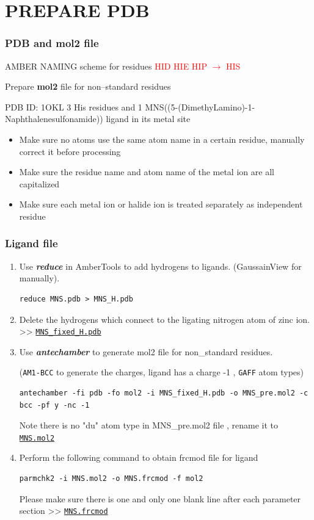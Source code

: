 \documentclass[hyperref={breaklinks,colorlinks}]{beamer}
\author{Zhang Haomiao } \institute{HUST} \date{\today}
\begin{document}
\frame{\maketitle} \frame{\tableofcontents{}}
\section{PREPARE PDB}
\begin{frame}  
  \frametitle{PDB and mol2 file}
  AMBER NAMING scheme for residues \textcolor{red}{HID HIE HIP
    $\rightarrow$ HIS}

  Prepare \textbf{mol2} file for non--standard residues
  \begin{block}{PDB ID: 1OKL}
    3 His residues and 1
    MNS((5-(DimethyLamino)-1-Naphthalenesulfonamide)) ligand in its
    metal site
  \end{block}
  \begin{itemize}
  \item Make sure no atoms use the same atom name in a certain
    residue, manually correct it before processing
  \item Make sure the residue name and atom name of the metal ion are
    all capitalized
  \item Make sure each metal ion or halide ion is treated separately
    as independent residue
  \end{itemize}
\end{frame}


\begin{frame}[t,fragile]
  \frametitle{Ligand file}
  \begin{enumerate}
  \item Use \textit{\textbf{reduce}} in AmberTools to add hydrogens to
    ligands. (GaussainView for manually).
\begin{lstlisting}
reduce MNS.pdb > MNS_H.pdb
\end{lstlisting}
  \item Delete the hydrogens which connect to the ligating nitrogen
    atom of zinc ion.  >> \underline{\texttt{MNS\_fixed\_H.pdb}} %
  \item Use \textit{\textbf{antechamber}} to generate mol2 file for
    non\_standard residues.

    (\texttt{AM1-BCC} to generate the charges, ligand has a charge -1
    , \texttt{GAFF} atom types)
\begin{lstlisting}
antechamber -fi pdb -fo mol2 -i MNS_fixed_H.pdb -o MNS_pre.mol2 -c bcc -pf y -nc -1 
\end{lstlisting}
    Note there is no "du" atom type in MNS\_pre.mol2 file , rename it
    to \underline{\texttt{MNS.mol2}}
  \item Perform the following command to obtain frcmod file for ligand
\begin{lstlisting}
parmchk2 -i MNS.mol2 -o MNS.frcmod -f mol2 
\end{lstlisting}
    Please make sure there is one and only one blank line after each
    parameter section >> \underline{\texttt{MNS.frcmod}}
  \end{enumerate}
\end{frame}
\end{document}

